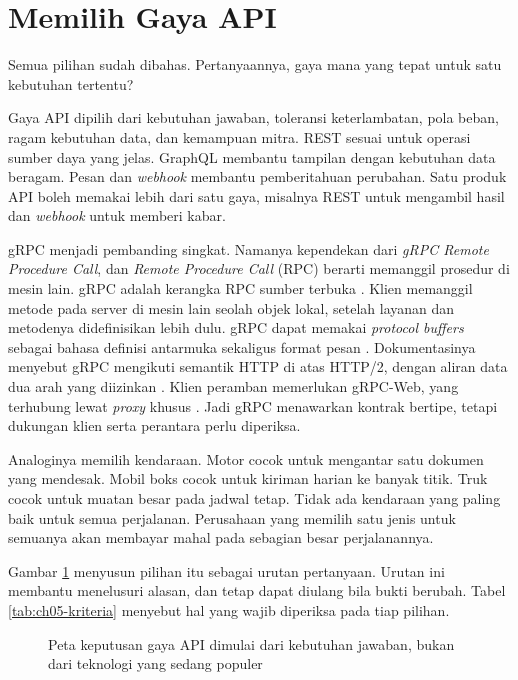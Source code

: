 \section{Memilih Gaya API}

Semua pilihan sudah dibahas. Pertanyaannya, gaya mana yang tepat untuk satu kebutuhan tertentu?

Gaya API dipilih dari kebutuhan jawaban, toleransi keterlambatan, pola beban, ragam kebutuhan data, dan kemampuan mitra. REST sesuai
untuk operasi sumber daya yang jelas. GraphQL membantu tampilan dengan kebutuhan data beragam. Pesan dan \textit{webhook} membantu
pemberitahuan perubahan. Satu produk API boleh memakai lebih dari satu gaya, misalnya REST untuk mengambil hasil dan \textit{webhook}
untuk memberi kabar.

gRPC menjadi pembanding singkat. Namanya kependekan dari \textit{gRPC Remote Procedure Call}, dan \textit{Remote Procedure Call} (RPC)
berarti memanggil prosedur di mesin lain. gRPC adalah kerangka RPC sumber terbuka \cite{c05-grpc-faq}. Klien memanggil metode pada server
di mesin lain seolah objek lokal, setelah layanan dan metodenya didefinisikan lebih dulu. gRPC dapat memakai \textit{protocol buffers}
sebagai bahasa definisi antarmuka sekaligus format pesan \cite{c05-grpc}. Dokumentasinya menyebut gRPC mengikuti semantik HTTP di atas
HTTP/2, dengan aliran data dua arah yang diizinkan \cite{c05-grpc-faq}. Klien peramban memerlukan gRPC-Web, yang terhubung lewat
\textit{proxy} khusus \cite{c05-grpc-web}. Jadi gRPC menawarkan kontrak bertipe, tetapi dukungan klien serta perantara perlu diperiksa.

Analoginya memilih kendaraan. Motor cocok untuk mengantar satu dokumen yang mendesak. Mobil boks cocok untuk kiriman harian ke banyak
titik. Truk cocok untuk muatan besar pada jadwal tetap. Tidak ada kendaraan yang paling baik untuk semua perjalanan. Perusahaan yang
memilih satu jenis untuk semuanya akan membayar mahal pada sebagian besar perjalanannya.

Gambar \ref{fig:ch05-peta-keputusan} menyusun pilihan itu sebagai urutan pertanyaan. Urutan ini membantu menelusuri alasan, dan tetap
dapat diulang bila bukti berubah. Tabel \ref{tab:ch05-kriteria} menyebut hal yang wajib diperiksa pada tiap pilihan.

\begin{figure}[!htb]
  \centering
  
  \caption{Peta keputusan gaya API dimulai dari kebutuhan jawaban, bukan dari teknologi yang sedang populer}
  \label{fig:ch05-peta-keputusan}
\end{figure}

